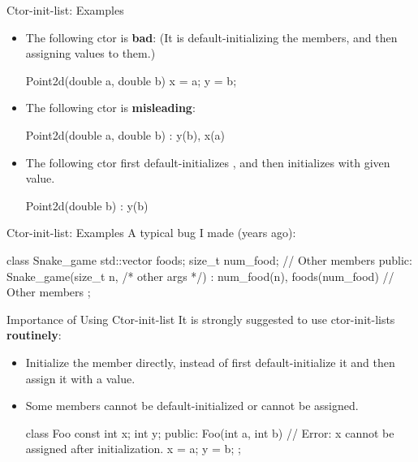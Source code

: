 \documentclass{beamer}
\begin{document}
\begin{frame}[fragile]{Ctor-init-list: Examples}
    \begin{itemize}
        \item The following ctor is \textbf{bad}: (It is default-initializing the members, and then assigning values to them.)
        \begin{cpp}
Point2d(double a, double b) {
  x = a;
  y = b;
}
        \end{cpp}
        \item The following ctor is \textbf{misleading}:
        \begin{cpp}
Point2d(double a, double b) : y(b), x(a) {}
        \end{cpp}
        \item The following ctor first default-initializes , and then initializes  with given value.
        \begin{cpp}
Point2d(double b) : y(b) {}
        \end{cpp}
    \end{itemize}
\end{frame}

\begin{frame}[fragile]{Ctor-init-list: Examples}
    A typical bug I made (years ago):
    \begin{cpp}
class Snake_game {
  std::vector foods;
  size_t num_food;
  // Other members
 public:
  Snake_game(size_t n, /* other args */)
    : num_food(n), foods(num_food) {}
  // Other members
};
    \end{cpp}
\end{frame}

\begin{frame}[fragile]{Importance of Using Ctor-init-list}
    It is strongly suggested to use ctor-init-lists \textbf{routinely}:
    \begin{itemize}
        \item Initialize the member directly, instead of first default-initialize it and then assign it with a value.
        \item Some members cannot be default-initialized or cannot be assigned.
        \begin{cpp}
class Foo {
  const int x;
  int y;
 public:
  Foo(int a, int b) {
    // Error: x cannot be assigned after initialization.
    x = a;
    y = b;
  }
};
        \end{cpp}
    \end{itemize}
\end{frame}
\end{document}
